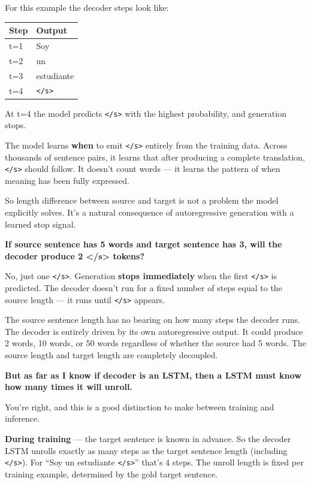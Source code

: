 For this example the decoder steps look like:

\begin{center}
\begin{tabular}{ll}
\hline
Step & Output \\
\hline
t=1 & Soy \\
t=2 & un \\
t=3 & estudiante \\
t=4 & \texttt{</s>} \\
\hline
\end{tabular}
\end{center}

At t=4 the model predicts \texttt{</s>} with the highest probability, and generation stops.

The model learns \textbf{when} to emit \texttt{</s>} entirely from the training data. Across thousands of sentence pairs, it learns that after producing a complete translation, \texttt{</s>} should follow. It doesn't count words --- it learns the pattern of when meaning has been fully expressed.

So length difference between source and target is not a problem the model explicitly solves. It's a natural consequence of autoregressive generation with a learned stop signal.

\bigskip

\textbf{If source sentence has 5 words and target sentence has 3, will the decoder produce 2 </s> tokens?}

No, just one \texttt{</s>}. Generation \textbf{stops immediately} when the first \texttt{</s>} is predicted. The decoder doesn't run for a fixed number of steps equal to the source length --- it runs until \texttt{</s>} appears.

The source sentence length has no bearing on how many steps the decoder runs. The decoder is entirely driven by its own autoregressive output. It could produce 2 words, 10 words, or 50 words regardless of whether the source had 5 words. The source length and target length are completely decoupled.

\bigskip

\textbf{But as far as I know if decoder is an LSTM, then a LSTM must know how many times it will unroll.}

You're right, and this is a good distinction to make between training and inference.

\textbf{During training} --- the target sentence is known in advance. So the decoder LSTM unrolls exactly as many steps as the target sentence length (including \texttt{</s>}). For ``Soy un estudiante \texttt{</s>}'' that's 4 steps. The unroll length is fixed per training example, determined by the gold target sentence.


